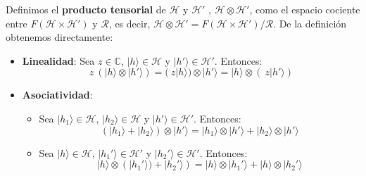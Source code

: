 Definimos el \textbf{producto tensorial} de $\mathscr{H}$ y $\mathscr{H}'$ , $\mathscr{H} \otimes \mathscr{H}'$, como el espacio cociente entre $F(\mathscr{H} \times \mathscr{H}')$ y $\mathscr{R}$, es decir, $\mathscr{H} \otimes \mathscr{H}' = F(\mathscr{H} \times \mathscr{H}')/\mathscr{R}$. De la definición obtenemos directamente:

\begin{itemize}
    \item \textbf{Linealidad}: Sea $z\in\mathbb{C}$, $|h\rangle\in\mathscr{H}$ y $|h'\rangle\in\mathscr{H}'$. Entonces:
        \begin{equation*}
            z\:(|h\rangle \otimes |h'\rangle) = (\:z|h\rangle) \otimes |h'\rangle = |h\rangle \otimes (\:z|h'\rangle)
        \end{equation*}
        
    \item \textbf{Asociatividad}:
    \begin{itemize}
        \item Sea $|h_{1}\rangle\in\mathscr{H}$, $|h_{2}\rangle\in\mathscr{H}$ y $|h'\rangle\in\mathscr{H}'$. Entonces:
            \begin{equation*}
                (|h_{1}\rangle + |h_{2}\rangle)\otimes|h'\rangle = |h_{1}\rangle \otimes|h'\rangle + |h_{2}\rangle \otimes|h'\rangle
            \end{equation*}

        \item Sea $|h\rangle\in\mathscr{H}$, $|h_{1}'\rangle\in\mathscr{H}'$ y $|h_{2}'\rangle\in\mathscr{H}'$. Entonces:
            \begin{equation*}
                |h\rangle \otimes (|h_{1}'\rangle) + |h_{2}'\rangle) = |h\rangle \otimes|h_{1}'\rangle + |h\rangle \otimes|h_{2}'\rangle
            \end{equation*}
    \end{itemize}
\end{itemize}

